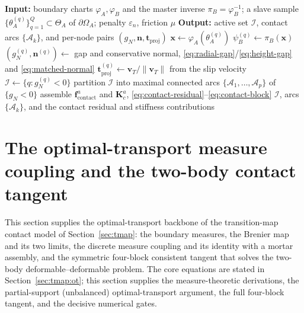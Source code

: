 \documentclass{svjour3}                 %
\newcommand{\norm}[1]{\lVert#1\rVert}
\newcommand{\nbf}{\bm{n}}
\newcommand{\tbf}{\bm{t}}
\newcommand{\xbf}{\bm{x}}
\newcommand{\fbf}{\bm{f}}
\newcommand{\vbf}{\bm{v}}
\newcommand{\gn}{g_{\scriptscriptstyle N}}
\newcommand{\map}[1]{\varphi_{#1}}
\begin{document}
\begin{algorithm}[htbp]
\caption{Transition-map contact detection}
\label{alg:contact-detection}
\begin{algorithmic}[1]
\Statex \textbf{Input:} boundary charts $\map{A},\map{B}$ and the master inverse $\pi_B=\map{B}^{-1}$; a slave
sample $\{\theta_A^{(q)}\}_{q=1}^{Q}\subset\Theta_A$ of $\partial\Omega_A$; penalty $\varepsilon_n$, friction $\mu$
\Statex \textbf{Output:} active set $\mathcal I$, contact arcs $\{\mathcal A_k\}$, and per-node pairs
$(\gn,\nbf,\tbf_{\mathrm{proj}})$
  \State $\xbf \gets \map{A}(\theta_A^{(q)})$ 
  \State $\psi_B^{(q)} \gets \pi_B(\xbf)$ 
  \State $(\gn^{(q)},\nbf^{(q)}) \gets$ gap and conservative normal, \eqref{eq:radial-gap}/\eqref{eq:height-gap} and \eqref{eq:matched-normal}
  \State $\tbf_{\mathrm{proj}}^{(q)} \gets \vbf_T/\norm{\vbf_T}$ from the slip velocity 
\EndFor
\State $\mathcal I \gets \{q:\gn^{(q)}<0\}$ 
\State partition $\mathcal I$ into maximal connected arcs $\{\mathcal A_1,\dots,\mathcal A_p\}$ of $\{\gn<0\}$ 
  \State assemble $\fbf^a_{\mathrm{contact}}$ and $\bm K^a_c$, \eqref{eq:contact-residual}--\eqref{eq:contact-block}
\EndFor
\State \Return $\mathcal I$, arcs $\{\mathcal A_k\}$, and the contact residual and stiffness contributions
\end{algorithmic}
\end{algorithm}

\section{The optimal-transport measure coupling and the two-body contact tangent}\label{app:ot}

This section supplies the optimal-transport backbone of the transition-map contact model of
Section~\ref{sec:tmap}: the boundary measures, the Brenier map and its two limits, the discrete measure coupling
and its identity with a mortar assembly, and the symmetric four-block consistent tangent that solves the
two-body deformable--deformable problem. The core equations are stated in Section~\ref{sec:tmap:ot}; this section
supplies the measure-theoretic derivations, the partial-support (unbalanced) optimal-transport argument, the full
four-block tangent, and the decisive numerical gates.
\end{document}
